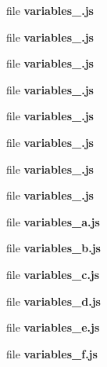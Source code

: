 \begin{DoxyCompactItemize}
\item 
file {\bf variables\-\_.\-js}
\item 
file {\bf variables\-\_.\-js}
\item 
file {\bf variables\-\_.\-js}
\item 
file {\bf variables\-\_.\-js}
\item 
file {\bf variables\-\_.\-js}
\item 
file {\bf variables\-\_.\-js}
\item 
file {\bf variables\-\_.\-js}
\item 
file {\bf variables\-\_.\-js}
\item 
file {\bf variables\-\_\-a.\-js}
\item 
file {\bf variables\-\_\-b.\-js}
\item 
file {\bf variables\-\_\-c.\-js}
\item 
file {\bf variables\-\_\-d.\-js}
\item 
file {\bf variables\-\_\-e.\-js}
\item 
file {\bf variables\-\_\-f.\-js}
\end{DoxyCompactItemize}
